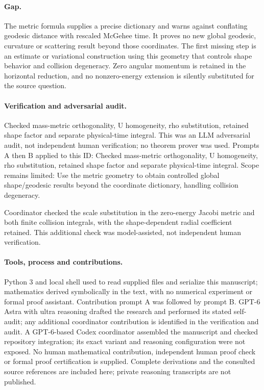 \documentclass[11pt]{article}
\begin{document}
\paragraph{Gap.}The metric formula supplies a precise dictionary and warns against conflating geodesic distance with rescaled McGehee time. It proves no new global geodesic, curvature or scattering result beyond those coordinates. The first missing step is an estimate or variational construction using this geometry that controls shape behavior and collision degeneracy. Zero angular momentum is retained in the horizontal reduction, and no nonzero-energy extension is silently substituted for the source question.

\paragraph{Verification and adversarial audit.}
Checked mass-metric orthogonality, U homogeneity, rho substitution, retained shape factor and separate physical-time integral. This was an LLM adversarial audit, not independent human verification; no theorem prover was used. Prompts A then B applied to this ID: Checked mass-metric orthogonality, U homogeneity, rho substitution, retained shape factor and separate physical-time integral. Scope remains limited: Use the metric geometry to obtain controlled global shape/geodesic results beyond the coordinate dictionary, handling collision degeneracy.

Coordinator checked the scale substitution in the zero-energy Jacobi metric and both finite collision integrals, with the shape-dependent radial coefficient retained. This additional check was model-assisted, not independent human verification.

\paragraph{Tools, process and contributions.}
Python 3 and local shell used to read supplied files and serialize this manuscript; mathematics derived symbolically in the text, with no numerical experiment or formal proof assistant. Contribution prompt A was followed by prompt B. GPT-6 Astra with ultra reasoning drafted the research and performed its stated self-audit; any additional coordinator contribution is identified in the verification and audit. A GPT-6-based Codex coordinator assembled the manuscript and checked repository integration; its exact variant and reasoning configuration were not exposed. No human mathematical contribution, independent human proof check or formal proof certification is supplied. Complete derivations and the consulted source references are included here; private reasoning transcripts are not published.
\end{document}
